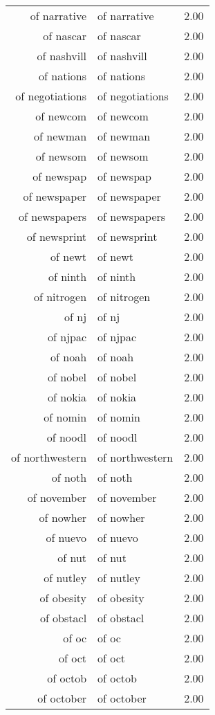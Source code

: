 \begin{table}[ht]
\begin{tabular}{rlr}
  of narrative & of narrative & 2.00 \\ 
  of nascar & of nascar & 2.00 \\ 
  of nashvill & of nashvill & 2.00 \\ 
  of nations & of nations & 2.00 \\ 
  of negotiations & of negotiations & 2.00 \\ 
  of newcom & of newcom & 2.00 \\ 
  of newman & of newman & 2.00 \\ 
  of newsom & of newsom & 2.00 \\ 
  of newspap & of newspap & 2.00 \\ 
  of newspaper & of newspaper & 2.00 \\ 
  of newspapers & of newspapers & 2.00 \\ 
  of newsprint & of newsprint & 2.00 \\ 
  of newt & of newt & 2.00 \\ 
  of ninth & of ninth & 2.00 \\ 
  of nitrogen & of nitrogen & 2.00 \\ 
  of nj & of nj & 2.00 \\ 
  of njpac & of njpac & 2.00 \\ 
  of noah & of noah & 2.00 \\ 
  of nobel & of nobel & 2.00 \\ 
  of nokia & of nokia & 2.00 \\ 
  of nomin & of nomin & 2.00 \\ 
  of noodl & of noodl & 2.00 \\ 
  of northwestern & of northwestern & 2.00 \\ 
  of noth & of noth & 2.00 \\ 
  of november & of november & 2.00 \\ 
  of nowher & of nowher & 2.00 \\ 
  of nuevo & of nuevo & 2.00 \\ 
  of nut & of nut & 2.00 \\ 
  of nutley & of nutley & 2.00 \\ 
  of obesity & of obesity & 2.00 \\ 
  of obstacl & of obstacl & 2.00 \\ 
  of oc & of oc & 2.00 \\ 
  of oct & of oct & 2.00 \\ 
  of octob & of octob & 2.00 \\ 
  of october & of october & 2.00 \\ 

\end{tabular}
\end{table}

